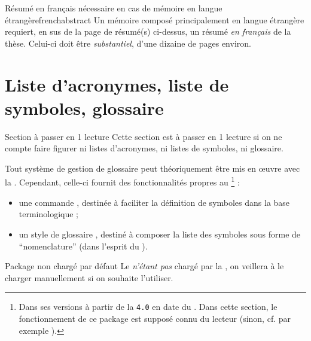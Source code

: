 \begin{dbwarning}{Résumé en français nécessaire en cas de mémoire en langue
    étrangère}{frenchabstract}
  Un mémoire composé principalement en langue étrangère  requiert, en sus de la page de
  résumé(s) ci-dessus, un résumé \emph{en français} de la thèse. Celui-ci doit
  être \emph{substantiel}, d'une dizaine de pages environ.
\end{dbwarning}

\section{Liste d'acronymes, liste de symboles,
  glossaire}\label{sec-sigl-gloss-nomencl}
%
%
%

\begin{dbremark*}{Section à passer en 1\iere{} lecture}
  Cette section est à passer en 1\iere{} lecture si on ne compte faire figurer
  ni listes d'acronymes, ni listes de symboles, ni glossaire.
\end{dbremark*}

Tout système de gestion de glossaire peut théoriquement être mis en œuvre avec
la \yatCl. Cependant, celle-ci fournit des fonctionnalités propres au
\footnote{Dans ses versions à partir de la \texttt{4.0} en
  date du . Dans cette section, le fonctionnement de
  ce package est supposé connu du lecteur (sinon, cf. par exemple
  \cite{en-ligne7}).} :
\begin{itemize}
\item une commande , destinée à faciliter la définition de
  symboles dans la base terminologique ;
\item un style de glossaire , destiné à composer la
  liste des symboles sous forme de \enquote{nomenclature} (dans l'esprit du
  ).
\end{itemize}

\begin{dbwarning}{Package  non chargé par défaut}{}
  Le  \emph{n'étant pas} chargé par la \yatCl, on veillera
  à le charger manuellement si on souhaite l'utiliser.
\end{dbwarning}

